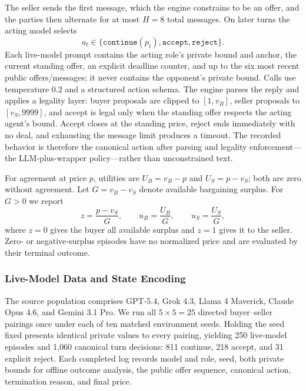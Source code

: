 \documentclass[conference]{IEEEtran}
\begin{document}
The seller sends the first message, which the engine constrains to be an offer, and the parties then alternate for at most $H=8$ total messages. On later turns the acting model selects
\begin{equation}
a_t\in\{\texttt{continue}(p_t),\texttt{accept},\texttt{reject}\}.
\end{equation}
Each live-model prompt contains the acting role's private bound and anchor, the current standing offer, an explicit deadline counter, and up to the six most recent public offers/messages; it never contains the opponent's private bound. Calls use temperature $0.2$ and a structured action schema. The engine parses the reply and applies a legality layer: buyer proposals are clipped to $[1,v_B]$, seller proposals to $[v_S,9999]$, and accept is legal only when the standing offer respects the acting agent's bound. Accept closes at the standing price, reject ends immediately with no deal, and exhausting the message limit produces a timeout. The recorded behavior is therefore the canonical action after parsing and legality enforcement---the LLM-plus-wrapper policy---rather than unconstrained text.

For agreement at price $p$, utilities are $U_B=v_B-p$ and $U_S=p-v_S$; both are zero without agreement. Let $G=v_B-v_S$ denote available bargaining surplus. For $G>0$ we report
\begin{equation}
z=\frac{p-v_S}{G},\qquad
u_B=\frac{U_B}{G},\qquad
u_S=\frac{U_S}{G},
\end{equation}
where $z=0$ gives the buyer all available surplus and $z=1$ gives it to the seller. Zero- or negative-surplus episodes have no normalized price and are evaluated by their terminal outcome.

\subsubsection{Live-Model Data and State Encoding}

The source population comprises GPT-5.4, Grok 4.3, Llama 4 Maverick, Claude Opus 4.6, and Gemini 3.1 Pro. We run all $5\times5=25$ directed buyer--seller pairings once under each of ten matched environment seeds. Holding the seed fixed presents identical private values to every pairing, yielding 250 live-model episodes and 1{,}060 canonical turn decisions: 811 continue, 218 accept, and 31 explicit reject. Each completed log records model and role, seed, both private bounds for offline outcome analysis, the public offer sequence, canonical action, termination reason, and final price.
\end{document}
